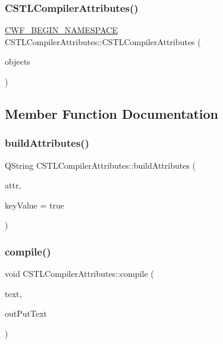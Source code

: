 \subsubsection{\texorpdfstring{C\+S\+T\+L\+Compiler\+Attributes()}{CSTLCompilerAttributes()}}
{\footnotesize\ttfamily \hyperlink{cppwebframework__global_8h_a7492e9498cbaf9cd17dbc2215d3a0e48}{C\+W\+F\+\_\+\+B\+E\+G\+I\+N\+\_\+\+N\+A\+M\+E\+S\+P\+A\+CE} C\+S\+T\+L\+Compiler\+Attributes\+::\+C\+S\+T\+L\+Compiler\+Attributes (\begin{DoxyParamCaption}\item[{Q\+Map$<$ Q\+String, Q\+Object $\ast$$>$ \&}]{objects }\end{DoxyParamCaption})\hspace{0.3cm}{\ttfamily [explicit]}}



\subsection{Member Function Documentation}
\mbox{\label{class_c_s_t_l_compiler_attributes_a68ca7d9d8ef45dd5f51a0977fb8df911}} 
\subsubsection{\texorpdfstring{build\+Attributes()}{buildAttributes()}}
{\footnotesize\ttfamily Q\+String C\+S\+T\+L\+Compiler\+Attributes\+::build\+Attributes (\begin{DoxyParamCaption}\item[{Q\+Map$<$ Q\+String, Q\+String $>$ \&}]{attr,  }\item[{bool}]{key\+Value = {\ttfamily true} }\end{DoxyParamCaption})}

\mbox{\label{class_c_s_t_l_compiler_attributes_a63a271e6d97a614a02cd692c8a1f6395}} 
\subsubsection{\texorpdfstring{compile()}{compile()}}
{\footnotesize\ttfamily void C\+S\+T\+L\+Compiler\+Attributes\+::compile (\begin{DoxyParamCaption}\item[{Q\+String \&}]{text,  }\item[{Q\+String \&}]{out\+Put\+Text }\end{DoxyParamCaption})}

